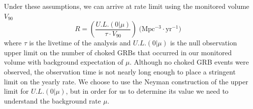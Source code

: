 \documentclass{gatech-thesis}
\begin{document}
Under these assumptions, we can arrive at rate limit using the monitored volume $V_{90}$
\begin{equation}\label{eq:v90}
R = \left(\frac{U.L.(0|\mu)}{\tau \cdot V_{90}}\right) \; \text{(Mpc$^{-3} \cdot$yr$^{-1}$)}
\end{equation}
where $\tau$ is the livetime of the analysis and $U.L.(0|\mu)$ is the null observation upper limit on the number of choked GRBs that occurred in our monitored volume with background expectation of $\mu$. Although no choked GRB events were observed, the observation time is not nearly long enough to place a stringent limit on the yearly rate. We choose to use the Neyman construction of the upper limit \cite{1937} for $U.L.(0|\mu)$, but in order for us to determine its value we need to understand the background rate $\mu$.
\end{document}

